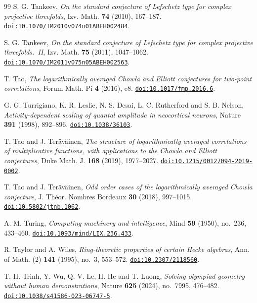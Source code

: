 \begin{thebibliography}{99}
S. G. Tankeev,
\emph{On the standard conjecture of Lefschetz type for complex projective threefolds},
Izv. Math. \textbf{74} (2010), 167--187.
\href{https://doi.org/10.1070/IM2010v074n01ABEH002484}{\nolinkurl{doi:10.1070/IM2010v074n01ABEH002484}}.

S. G. Tankeev,
\emph{On the standard conjecture of Lefschetz type for complex projective threefolds.~II},
Izv. Math. \textbf{75} (2011), 1047--1062.
\href{https://doi.org/10.1070/IM2011v075n05ABEH002563}{\nolinkurl{doi:10.1070/IM2011v075n05ABEH002563}}.

T. Tao,
\emph{The logarithmically averaged Chowla and Elliott conjectures for two-point correlations},
Forum Math. Pi \textbf{4} (2016), e8.
\href{https://doi.org/10.1017/fmp.2016.6}{\nolinkurl{doi:10.1017/fmp.2016.6}}.

G. G. Turrigiano, K. R. Leslie, N. S. Desai, L. C. Rutherford and S. B. Nelson,
\emph{Activity-dependent scaling of quantal amplitude in neocortical neurons},
Nature \textbf{391} (1998), 892--896.
\href{https://doi.org/10.1038/36103}{\nolinkurl{doi:10.1038/36103}}.

T. Tao and J. Ter\"av\"ainen,
\emph{The structure of logarithmically averaged correlations of multiplicative functions, with applications to the Chowla and Elliott conjectures},
Duke Math. J. \textbf{168} (2019), 1977--2027.
\href{https://doi.org/10.1215/00127094-2019-0002}{\nolinkurl{doi:10.1215/00127094-2019-0002}}.

T. Tao and J. Ter\"av\"ainen,
\emph{Odd order cases of the logarithmically averaged Chowla conjecture},
J. Th\'eor. Nombres Bordeaux \textbf{30} (2018), 997--1015.
\href{https://doi.org/10.5802/jtnb.1062}{\nolinkurl{doi:10.5802/jtnb.1062}}.

A. M. Turing,
\emph{Computing machinery and intelligence},
Mind \textbf{59} (1950), no.~236, 433--460.
\href{https://doi.org/10.1093/mind/LIX.236.433}{\nolinkurl{doi:10.1093/mind/LIX.236.433}}.

R. Taylor and A. Wiles,
\emph{Ring-theoretic properties of certain Hecke algebras},
Ann. of Math. (2) \textbf{141} (1995), no.~3, 553--572.
\href{https://doi.org/10.2307/2118560}{\nolinkurl{doi:10.2307/2118560}}.

T. H. Trinh, Y. Wu, Q. V. Le, H. He and T. Luong,
\emph{Solving olympiad geometry without human demonstrations},
Nature \textbf{625} (2024), no.~7995, 476--482.
\href{https://doi.org/10.1038/s41586-023-06747-5}{\nolinkurl{doi:10.1038/s41586-023-06747-5}}.


\end{thebibliography}
